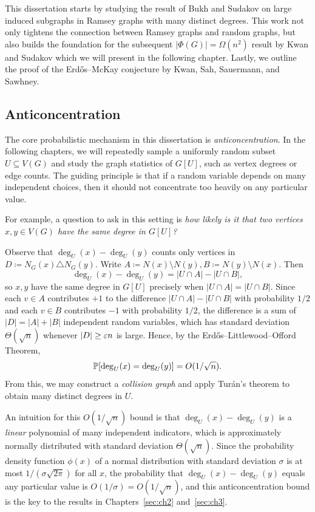 This dissertation starts by studying the result of Bukh and Sudakov on large induced subgraphs in Ramsey graphs with many distinct degrees. This work not only tightens the connection between Ramsey graphs and random graphs, but also builds the foundation for the subsequent $|\Phi(G)| = \Omega(n^2)$ result by Kwan and Sudakov which we will present in the following chapter. Lastly, we outline the proof of the Erd\H{o}s--McKay conjecture by Kwan, Sah, Sauermann, and Sawhney.

\subsection{Anticoncentration}\label{sec:anticoncentration}

The core probabilistic mechanism in this dissertation is \textit{anticoncentration}. In the following chapters, we will repeatedly sample a uniformly random subset $U\subseteq V(G)$ and study the graph statistics of $G[U]$, such as vertex degrees or edge counts. The guiding principle is that if a random variable depends on many independent choices, then it should not concentrate too heavily on any particular value.

For example, a question to ask in this setting is \textit{how likely is it that two vertices $x, y \in V(G)$ have the same degree in $G[U]$?}

Observe that $\deg_U(x)-\deg_U(y)$ counts only vertices in $D \coloneqq N_G(x)\triangle N_G(y)$. Write
$A \coloneqq N(x)\setminus N(y), B \coloneqq N(y)\setminus N(x)$. Then
\begin{equation}\label{eq:deg-diff}
  \deg_U(x) - \deg_U(y) = |U \cap A| - |U \cap B|,
\end{equation}
so $x, y$ have the same degree in $G[U]$ precisely when $|U \cap A|=|U \cap B|$. Since each $v \in A$ contributes $+1$ to the difference $|U \cap A| - |U \cap B|$ with probability $1/2$ and each $v \in B$ contributes $-1$ with probability $1/2$, the difference is a sum of $|D| = |A| + |B|$ independent random variables, which has standard deviation $\Theta(\sqrt{n})$ whenever $|D| \geq \varepsilon n$ is large. Hence, by the Erd\H{o}s--Littlewood--Offord Theorem, 
\[
  \mathbb{P}[\operatorname{deg}_U(x) = \operatorname{deg}_U(y)] = O(1/\sqrt{n}).
\]
From this, we may construct a \textit{collision graph} and apply Tur\'{a}n's theorem to obtain many distinct degrees in $U$.

An intuition for this $O(1/\sqrt{n})$ bound is that $\deg_U(x) - \deg_U(y)$ is a \textit{linear} polynomial of many independent indicators, which is approximately normally distributed with standard deviation $\Theta(\sqrt{n})$. Since the probability density function $\phi(x)$ of a normal distribution with standard deviation $\sigma$ is at most $1/(\sigma\sqrt{2\pi})$ for all $x$, the probability that $\deg_U(x) - \deg_U(y)$ equals any particular value is $O(1/\sigma) = O(1/\sqrt{n})$, and this anticoncentration bound is the key to the results in Chapters~\ref{sec:ch2} and~\ref{sec:ch3}. 

